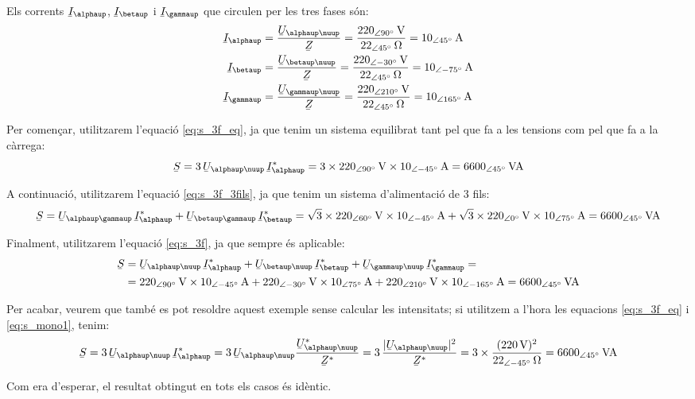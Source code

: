 \begin{exemple}
    Els corrents $\cmplx{I}_\alphaup$, $\cmplx{I}_\betaup$ i $\cmplx{I}_\gammaup$ que
    circulen  per les tres fases s\'{o}n:
    \begin{align*}
        \cmplx{I}_\alphaup &=\frac{\cmplx{U}_{\alphaup\nuup}}{\cmplx{Z}} =
        \frac{\SIpd{220}{90}{V}}{\SIpd{22}{45}{\ohm}} =
        \SIpd{10}{45}{A}\\
        \cmplx{I}_\betaup &=\frac{\cmplx{U}_{\betaup\nuup}}{\cmplx{Z}} =
        \frac{\SIpd{220}{-30}{V}}{\SIpd{22}{45}{\ohm}} =
        \SIpd{10}{-75}{A}\\
        \cmplx{I}_\gammaup &=\frac{\cmplx{U}_{\gammaup\nuup}}{\cmplx{Z}} =
        \frac{\SIpd{220}{210}{V}}{\SIpd{22}{45}{\ohm}} =
        \SIpd{10}{165}{A}
    \end{align*}


    Per comen\c{c}ar,  utilitzarem l'equaci\'{o} \eqref{eq:s_3f_eq}, ja que tenim
    un sistema equilibrat tant pel que fa a les tensions com pel que fa a la c\`{a}rrega:
    \[
    \cmplx{S} = 3\,\cmplx{U}_{\alphaup\nuup} \,\cmplx{I}_\alphaup^* =
    3\times \SIpd{220}{90}{V} \times
    \SIpd{10}{-45}{A} = \SIpd{6600}{45}{VA}
    \]

    A continuaci\'{o},  utilitzarem l'equaci\'{o} \eqref{eq:s_3f_3fils}, ja que tenim
    un sistema d'alimentaci\'{o} de 3 fils:
    \[
    \cmplx{S} = \cmplx{U}_{\alphaup\gammaup} \,\cmplx{I}_\alphaup^*
     +  \cmplx{U}_{\betaup\gammaup} \,\cmplx{I}_\betaup^* =
    \sqrt{3}\times \SIpd{220}{60}{V} \times
    \SIpd{10}{-45}{A} + \sqrt{3}\times \SIpd{220}{0}{V}
    \times \SIpd{10}{75}{A}  = \SIpd{6600}{45}{VA}
    \]

     Finalment,  utilitzarem l'equaci\'{o} \eqref{eq:s_3f}, ja que
     sempre \'{e}s aplicable:
     \[\begin{split}
     \cmplx{S} &=  \cmplx{U}_{\alphaup\nuup} \,\cmplx{I}_\alphaup^* +
     \cmplx{U}_{\betaup\nuup} \,\cmplx{I}_\betaup^* +  \cmplx{U}_{\gammaup\nuup}\,
     \cmplx{I}_\gammaup^* =\\
     &= \SIpd{220}{90}{V}
     \times \SIpd{10}{-45}{A} + \SIpd{220}{-30}{V} \times \SIpd{10}{75}{A}
     + \SIpd{220}{210}{V} \times \SIpd{10}{-165}{A} = \SIpd{6600}{45}{VA}
     \end{split} \]

    Per acabar, veurem que tamb\'{e} es pot resoldre aquest exemple
    sense calcular les intensitats; si utilitzem a l'hora les
    equacions \eqref{eq:s_3f_eq} i \eqref{eq:s_mono1}, tenim:
    \[
    \cmplx{S} = 3\,\cmplx{U}_{\alphaup\nuup} \,\cmplx{I}_\alphaup^* =
    3\,\cmplx{U}_{\alphaup\nuup}\frac{\cmplx{U}_{\alphaup\nuup}^*}{\cmplx{Z}^*} =
    3\, \frac{|\cmplx{U}_{\alphaup\nuup}|^2}{\cmplx{Z}^*} =
    3\times\frac{(\SI{220}{V})^2}{\SIpd{22}{-45}{\ohm}} =
    \SIpd{6600}{45}{VA}
    \]

    Com era d'esperar, el resultat obtingut en tots els casos
    \'{e}s id\`{e}ntic.
\end{exemple}

